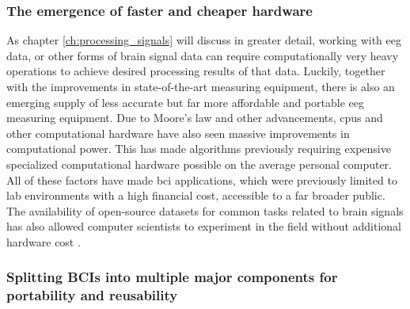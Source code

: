 
\subsubsection{The emergence of faster and cheaper hardware}
\label{subsubsec:bci_gaining_popularity_better_processing_cheaper}

As chapter \ref{ch:processing_signals} will discuss in greater detail, working with \gls{eeg} data, or other forms of brain signal data can require computationally very heavy operations to achieve desired processing results of that data.
Luckily, together with the improvements in state-of-the-art measuring equipment, there is also an emerging supply of less accurate but far more affordable and portable \gls{eeg} measuring equipment.
Due to Moore's law \citep{moores_law} and other advancements, \glspl{cpu} and other computational hardware have also seen massive improvements in computational power.
This has made algorithms previously requiring expensive specialized computational hardware possible on the average personal computer.
All of these factors have made \gls{bci} applications, which were previously limited to lab environments with a high financial cost, accessible to a far broader public.
The availability of open-source datasets for common tasks related to brain signals has also allowed computer scientists to experiment in the field without additional hardware cost \citep{eeg_data}.


\subsubsection{Splitting BCIs into multiple major components for portability and reusability}
\label{subsubsec:bci_gaining_popularity_better_processing_split_into_components}

